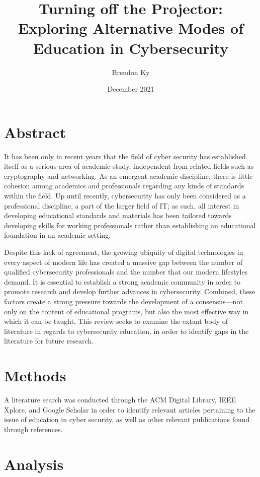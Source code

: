 \documentclass{article}
\title{
    Turning off the Projector: \\
    \large Exploring Alternative Modes of Education in Cybersecurity
}
\author{Brendon Ky}
\date{December 2021}
\begin{document}
\maketitle

\section{Abstract}

    It has been only in recent years that the field of cyber security has established itself as a serious area of academic study, independent from related fields such as cryptography and networking. 
    As an emergent academic discipline, there is little cohesion among academics and professionals regarding any kinds of standards within the field. 
    Up until recently, cybersecurity has only been considered as a professional discipline, a part of the larger field of IT; 
    as such, all interest in developing educational standards and materials has been tailored towards developing skills for working professionals rather than establishing an educational foundation in an academic setting. 

    Despite this lack of agreement, the growing ubiquity of digital technologies in every aspect of modern life has created a massive gap between the number of qualified cybersecurity professionals and the number that our modern lifestyles demand. It is essential to establish a strong academic community in order to promote research and develop further advances in cybersecurity. 
    Combined, these factors create a strong pressure towards the development of a consensus---not only on the content of educational programs, but also the most effective way in which it can be taught. 
    This review seeks to examine the extant body of literature in regards to cybersecurity education, in order to identify gaps in the literature for future research.

\section{Methods}

    A literature search was conducted through the ACM Digital Library, IEEE Xplore, and Google Scholar in order to identify relevant articles pertaining to the issue of education in cyber security, as well as other relevant publications found through references.

\section{Analysis}
\end{document}

